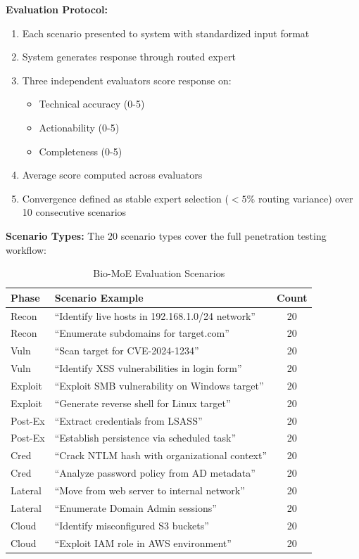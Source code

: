 \documentclass[preprint,12pt]{elsarticle}
\begin{document}
\textbf{Evaluation Protocol:}
\begin{enumerate}
    \item Each scenario presented to system with standardized input format
    \item System generates response through routed expert
    \item Three independent evaluators score response on:
    \begin{itemize}
        \item Technical accuracy (0-5)
        \item Actionability (0-5)
        \item Completeness (0-5)
    \end{itemize}
    \item Average score computed across evaluators
    \item Convergence defined as stable expert selection ($<5\%$ routing variance) over 10 consecutive scenarios
\end{enumerate}

\textbf{Scenario Types:} The 20 scenario types cover the full penetration testing workflow:
\begin{table}[htbp]
\centering
\caption{Bio-MoE Evaluation Scenarios}
\label{tab:scenarios}
\begin{tabular}{llc}
\toprule
\textbf{Phase} & \textbf{Scenario Example} & \textbf{Count} \\
\midrule
Recon & ``Identify live hosts in 192.168.1.0/24 network'' & 20 \\
Recon & ``Enumerate subdomains for target.com'' & 20 \\
Vuln & ``Scan target for CVE-2024-1234'' & 20 \\
Vuln & ``Identify XSS vulnerabilities in login form'' & 20 \\
Exploit & ``Exploit SMB vulnerability on Windows target'' & 20 \\
Exploit & ``Generate reverse shell for Linux target'' & 20 \\
Post-Ex & ``Extract credentials from LSASS'' & 20 \\
Post-Ex & ``Establish persistence via scheduled task'' & 20 \\
Cred & ``Crack NTLM hash with organizational context'' & 20 \\
Cred & ``Analyze password policy from AD metadata'' & 20 \\
Lateral & ``Move from web server to internal network'' & 20 \\
Lateral & ``Enumerate Domain Admin sessions'' & 20 \\
Cloud & ``Identify misconfigured S3 buckets'' & 20 \\
Cloud & ``Exploit IAM role in AWS environment'' & 20 \\
\bottomrule
\end{tabular}
\end{table}
\end{document}
